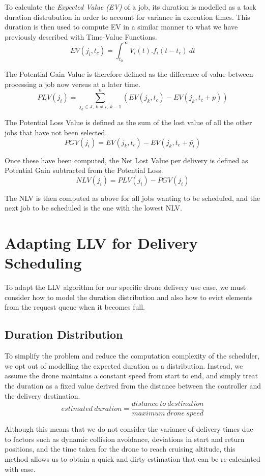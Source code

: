 \documentclass[a4paper,11pt,titlepage]{report}
\begin{document}
To calculate the \textit{Expected Value (EV)} of a job, its duration is modelled as a task duration distrubution in order to account for variance in execution times. This duration is then used to compute EV in a similar manner to what we have previously described with Time-Value Functions.
$$ EV(j_{i}, t_{c}) = \int_{t_{0}}^{\infty} V_{i}(t).f_{i}(t-t_{c})\ dt $$

\clearpage
The Potential Gain Value is therefore defined as the difference of value between processing a job now versus at a later time.
$$ PLV(j_{i}) = \sum_{j_{k}\in J,\ k\neq i,\ k-1}^{n} (EV(j_{k},t_{c}) - EV(j_{k}, t_{c}+p)) $$

The Potential Loss Value is defined as the sum of the lost value of all the other jobs that have not been selected.
$$ PGV(j_{i}) = EV(j_{k},t_{c}) - EV(j_{k}, t_{c}+\bar{p_{i}}) $$

Once these have been computed, the Net Lost Value per delivery is defined as Potential Gain subtracted from the Potential Loss.
$$ NLV(j_{i}) = PLV(j_{i}) - PGV(j_{i}) $$

The NLV is then computed as above for all jobs wanting to be scheduled, and the next job to be scheduled is the one with the lowest NLV.

\section{Adapting LLV for Delivery Scheduling}
To adapt the LLV algorithm for our specific drone delivery use case, we must consider how to model the duration distribution and also how to evict elements from the request queue when it becomes full.

\subsection{Duration Distribution}
To simplify the problem and reduce the computation complexity of the scheduler, we opt out of modelling the expected duration as a distribution. Instead, we assume the drone maintains a constant speed from start to end, and simply treat the duration as a fixed value derived from the distance between the controller and the delivery destination.
$$ estimated\ duration = \frac{distance\ to\ destination}{maximum\ drone\ speed} $$

Although this means that we do not consider the variance of delivery times due to factors such as dynamic collision avoidance, deviations in start and return positions, and the time taken for the drone to reach cruising altitude, this method allows us to obtain a quick and dirty estimation that can be re-calculated with ease.\\
\end{document}
